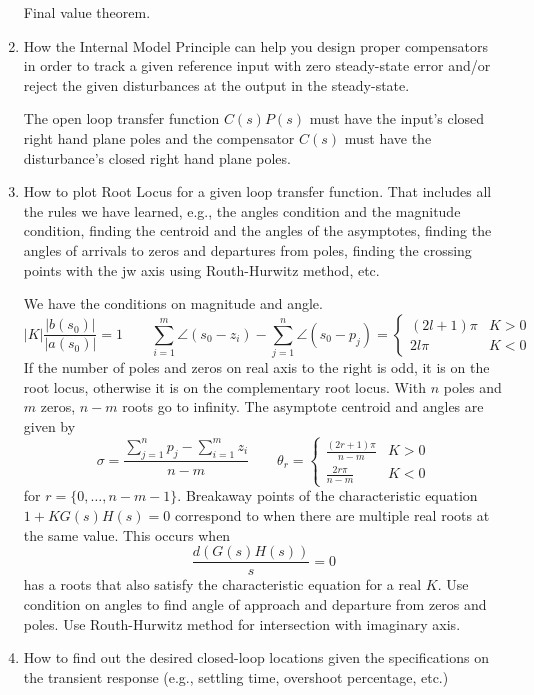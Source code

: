 \documentclass[10pt]{article}
\begin{document}
\begin{enumerate}
    Final value theorem.

    \item How the Internal Model Principle can help you design proper compensators in order to
    track a given reference input with zero steady-state error and/or reject the given disturbances
    at the output in the steady-state.

    The open loop transfer function \(C(s)P(s)\) must have the input's closed right hand plane poles
    and the compensator \(C(s)\) must have the disturbance's closed right hand plane poles.

    \item How to plot Root Locus for a given loop transfer function. That includes all the
    rules we have learned, e.g., the angles condition and the magnitude condition, finding the
    centroid and the angles of the asymptotes, finding the angles of arrivals to zeros and
    departures from poles, finding the crossing points with the jw axis using Routh-Hurwitz method, etc.

    We have the conditions on magnitude and angle.
    \[|K|\frac{|b(s_0)|}{|a(s_0)|}=1\qquad\sum_{i=1}^m\angle(s_0-z_i)-\sum_{j=1}^n\angle(s_0-p_j)=\begin{cases}
        (2l+1)\pi & K>0\\
        2l\pi & K<0
    \end{cases}\]
    If the number of poles and zeros on real axis to the right is odd, it is on the root locus, otherwise
    it is on the complementary root locus. With \(n\) poles and \(m\) zeros, \(n-m\) roots go to infinity.
    The asymptote centroid and angles are given by
    \[\sigma=\frac{\sum_{j=1}^np_j -\sum_{i=1}^m z_i}{n-m}\qquad\theta_r=\begin{cases}
        \frac{(2r+1)\pi}{n-m} & K>0\\
        \frac{2r\pi}{n-m} & K<0
    \end{cases}\]
    for \(r=\{0,\ldots, n-m-1\}\). Breakaway points of the characteristic equation \(1+KG(s)H(s)=0\) correspond
    to when there are multiple real roots at the same value. This occurs when
    \[\frac{d(G(s)H(s))}{s}=0\]
    has a roots that also satisfy the characteristic equation for a real \(K\). Use condition on angles to find angle
    of approach and departure from zeros and poles. Use Routh-Hurwitz method for intersection with imaginary axis.

    \item How to find out the desired closed-loop locations given the specifications on the
    transient response (e.g., settling time, overshoot percentage, etc.)


\end{enumerate}
\end{document}
